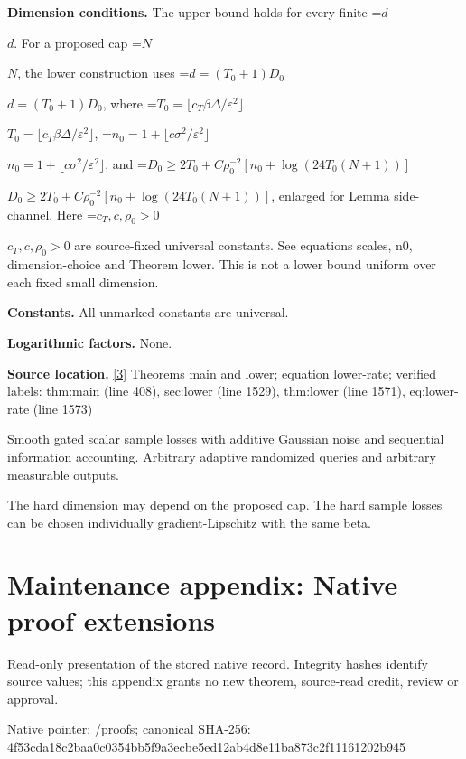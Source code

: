 \documentclass[10pt,a4paper]{article}
\newcommand{\AtlasMath}[1]{\par\begingroup\centering\setbox0=\hbox{$\displaystyle #1$}\ifdim\wd0>1.4\linewidth\typeout{ATLAS WIDE FORMULA: \the\wd0}\fi\ifdim\wd0>\linewidth\resizebox{\linewidth}{!}{\box0}\else\box0\fi\par\endgroup}
\newcommand{\AtlasInlineMath}[1]{\begingroup\setbox0=\hbox{$#1$}\ifdim\wd0>.4\linewidth\endgroup\AtlasMath{#1}\else\endgroup$#1$\fi}
\begin{document}
\textbf{Dimension conditions.} The upper bound holds for every finite \AtlasInlineMath{d}. For a proposed cap \AtlasInlineMath{N}, the lower construction uses \AtlasInlineMath{d=(T_0+1)D_0}, where \AtlasInlineMath{T_0=\lfloor c_T\beta\Delta/\varepsilon^2\rfloor}, \AtlasInlineMath{n_0=1+\lfloor c\sigma^2/\varepsilon^2\rfloor}, and \AtlasInlineMath{D_0\ge2T_0+C\rho_0^{-2}[n_0+\log(24T_0(N+1))]}, enlarged for Lemma side-channel. Here \AtlasInlineMath{c_T,c,\rho_0>0} are source-fixed universal constants. See equations scales, n0, dimension-choice and Theorem lower. This is not a lower bound uniform over each fixed small dimension.



\textbf{Constants.} All unmarked constants are universal.



\textbf{Logarithmic factors.} None.



\textbf{Source location.} \href{https://github.com/WU-Wendao/Colombo/blob/main/colombo_sensorium/Complexity_altas/data/sources/colombo/0902/manuscript.pdf}{[3]} Theorems main and lower; equation lower-rate; verified labels: thm:main (line 408), sec:lower (line 1529), thm:lower (line 1571), eq:lower-rate (line 1573)



Smooth gated scalar sample losses with additive Gaussian noise and sequential information accounting. Arbitrary adaptive randomized queries and arbitrary measurable outputs.



The hard dimension may depend on the proposed cap. The hard sample losses can be chosen individually gradient-Lipschitz with the same beta.



\section{Maintenance appendix: Native proof extensions}


Read-only presentation of the stored native record. Integrity hashes identify source values; this appendix grants no new theorem, source-read credit, review or approval.



Native pointer: /proofs; canonical SHA-256: 4f53cda18c2baa0c0354bb5f\allowbreak{}9a3ecbe5ed12ab4d8e11ba87\allowbreak{}3c2f11161202b945
\end{document}
